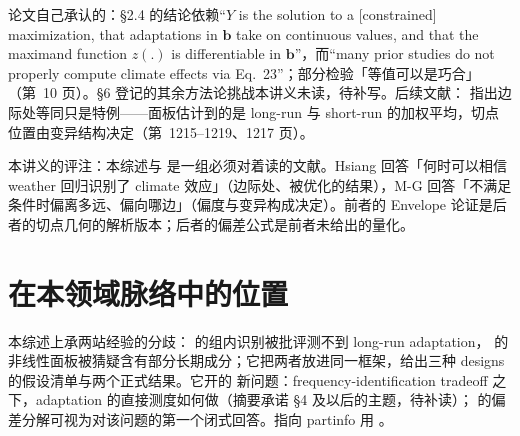 论文自己承认的：§2.4 的结论依赖``$Y$ is the solution to a [constrained] maximization, that adaptations in $\mathbf{b}$ take on continuous values, and that the maximand function $z(.)$ is differentiable in $\mathbf{b}$''\citep[第~14 页]{hsiang2016climate}，而``many prior studies do not properly compute climate effects via Eq.~23''\citep[第~14 页，作者点名 Schlenker et al. 2013 与 Houser et al. 2015 为例外]{hsiang2016climate}；部分检验「等值可以是巧合」（第~10 页）。§6 登记的其余方法论挑战本讲义未读，待补写。后续文献： 指出边际处等同只是特例——面板估计到的是 long-run 与 short-run 的加权平均，切点位置由变异结构决定（第~1215--1219、1217 页）。

本讲义的评注：本综述与  是一组必须对着读的文献。Hsiang 回答「何时可以相信 weather 回归识别了 climate 效应」（边际处、被优化的结果），M-G 回答「不满足条件时偏离多远、偏向哪边」（偏度与变异构成决定）。前者的 Envelope 论证是后者的切点几何的解析版本；后者的偏差公式是前者未给出的量化。

\section{在本领域脉络中的位置}

本综述上承两站经验的分歧： 的组内识别被批评测不到 long-run adaptation， 的非线性面板被猜疑含有部分长期成分；它把两者放进同一框架，给出三种 designs 的假设清单与两个正式结果。它开的 新问题：frequency-identification tradeoff 之下，adaptation 的直接测度如何做（摘要承诺 §4 及以后的主题，待补读）； 的偏差分解可视为对该问题的第一个闭式回答。指向 partinfo 用 。

\chapterrefs
